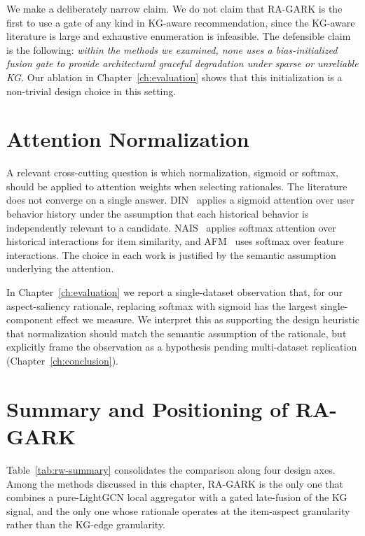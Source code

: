 We make a deliberately narrow claim. We do not claim that RA-GARK is the first to use a gate of any kind in KG-aware recommendation, since the KG-aware literature is large and exhaustive enumeration is infeasible. The defensible claim is the following: \emph{within the methods we examined, none uses a bias-initialized fusion gate to provide architectural graceful degradation under sparse or unreliable KG.} Our ablation in Chapter~\ref{ch:evaluation} shows that this initialization is a non-trivial design choice in this setting.

\section{Attention Normalization}
\label{sec:rw-attention-norm}

A relevant cross-cutting question is which normalization, sigmoid or softmax, should be applied to attention weights when selecting rationales. The literature does not converge on a single answer. DIN~\cite{zhou2018din} applies a sigmoid attention over user behavior history under the assumption that each historical behavior is independently relevant to a candidate. NAIS~\cite{he2018nais} applies softmax attention over historical interactions for item similarity, and AFM~\cite{xiao2017afm} uses softmax over feature interactions. The choice in each work is justified by the semantic assumption underlying the attention.

In Chapter~\ref{ch:evaluation} we report a single-dataset observation that, for our aspect-saliency rationale, replacing softmax with sigmoid has the largest single-component effect we measure. We interpret this as supporting the design heuristic that normalization should match the semantic assumption of the rationale, but explicitly frame the observation as a hypothesis pending multi-dataset replication (Chapter~\ref{ch:conclusion}).

\section{Summary and Positioning of RA-GARK}
\label{sec:rw-summary}

Table~\ref{tab:rw-summary} consolidates the comparison along four design axes. Among the methods discussed in this chapter, RA-GARK is the only one that combines a pure-LightGCN local aggregator with a gated late-fusion of the KG signal, and the only one whose rationale operates at the item-aspect granularity rather than the KG-edge granularity.

